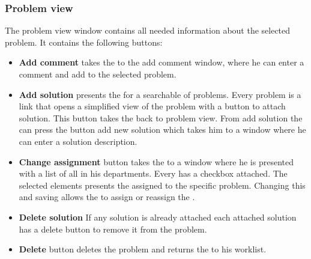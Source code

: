 \subsubsection{Problem view}
The problem view window contains all needed information about the selected problem. It contains the following buttons: 
\begin{itemize}
\item \textbf{Add comment}  takes the \astaff{} to the add comment window, where he can enter a comment and add to the selected problem. 

\item \textbf{Add solution} presents the \astaff{} for a searchable of problems. Every problem is a link that opens a simplified view of the problem with a button to attach solution. This button takes the \astaff{} back to problem view. From add solution the \astaff{} can press the button add new solution which takes him to a window where he can enter a solution description. 

\item \textbf{Change assignment} button takes the \astaff{} to a window where he is presented with a list of all \staff{} in his departments. Every \staff{} has a checkbox attached. The selected elements presents the \staff{} assigned to the specific problem. Changing this and saving allows the \astaff{} to assign or reassign the \astaff{}. 

\item \textbf{Delete solution} If any solution is already attached each attached solution has a delete button to remove it from the problem. 

\item \textbf{Delete} button deletes the problem and returns the \staff{} to his worklist.

\end{itemize}









